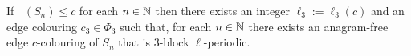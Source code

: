 \documentclass{patmorin}
\DeclareMathOperator{\afci}{\overline{\chi}_\pi}
\begin{document}
\begin{lem}\label{block_breakers}
    If $\afci(S_n)\le c$ for each $n\in\mathbb{N}$ then there exists an integer $\ell_3:=\ell_3(c)$ and an edge colouring $c_3\in\Phi_3$ such that, for each $n\in\mathbb{N}$ there exists an anagram-free edge $c$-colouring of $S_n$ that is $3$-block $\ell$-periodic.
\end{lem}








%
%
%
\end{document}
